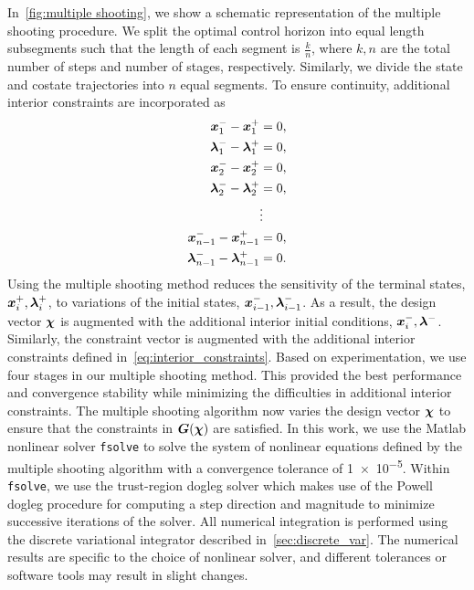 \documentclass[smallcondensed]{svjour3}
\begin{document}
In~\cref{fig:multiple shooting}, we show a schematic representation of the multiple shooting procedure.
We split the optimal control horizon into equal length subsegments such that the length of each segment is \( \frac{k}{n} \), where \( k, n \) are the total number of steps and number of stages, respectively.
Similarly, we divide the state and costate trajectories into \( n \) equal segments. 
To ensure continuity, additional interior constraints are incorporated as
\begin{subequations}
\begin{align}\label{eq:interior_constraints}
        \bm{x}_1^{-} - \bm{x}_1^{+} &= 0 , \\ 
        \bm{\lambda}_1^{-} - \bm{\lambda}_1^{+} &= 0 , \\
        \bm{x}_2^{-} - \bm{x}_2^{+} &= 0 , \\ 
        \bm{\lambda}_2^{-} - \bm{\lambda}_2^{+} &= 0 , \\
        &\vdots \nonumber \\
        \bm{x}_{n-1}^{-} - \bm{x}_{n-1}^{+} &= 0 , \\ 
        \bm{\lambda}_{n-1}^{-} - \bm{\lambda}_{n-1}^{+} &= 0.
\end{align}
\end{subequations}
Using the multiple shooting method reduces the sensitivity of the terminal states, \( \bm{x}_i^{+}, \bm{\lambda}_i^{+}\), to variations of the initial states, \(\bm{x}_{i-1}^{-}, \bm{\lambda}_{i-1}^{-}\).
As a result, the design vector \( \bm{\chi} \) is augmented with the additional interior initial conditions, \( \bm{x}_i^{-}, \bm{\lambda}^{-}\).
Similarly, the constraint vector is augmented with the additional interior constraints defined in~\cref{eq:interior_constraints}.
Based on experimentation, we use four stages in our multiple shooting method.
This provided the best performance and convergence stability while minimizing the difficulties in additional interior constraints.
The multiple shooting algorithm now varies the design vector \( \bm{\chi}\) to ensure that the constraints in \( \bm{G}(\bm{\chi}) \) are satisfied.
In this work, we use the Matlab nonlinear solver \texttt{fsolve} to solve the system of nonlinear equations defined by the multiple shooting algorithm with a convergence tolerance of \num{1e-5}.
Within \texttt{fsolve}, we use the trust-region dogleg solver which makes use of the Powell dogleg procedure for computing a step direction and magnitude to minimize successive iterations of the solver.
All numerical integration is performed using the discrete variational integrator described in~\cref{sec:discrete_var}.
The numerical results are specific to the choice of nonlinear solver, and different tolerances or software tools may result in slight changes.
\end{document}
